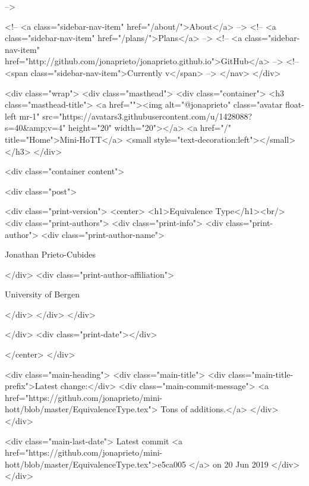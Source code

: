       
     -->

    <!-- <a class="sidebar-nav-item" href="/about/">About</a> -->
    <!-- <a class="sidebar-nav-item" href="/plans/">Plans</a> -->
    <!-- <a class="sidebar-nav-item" href="http://github.com/jonaprieto/jonaprieto.github.io">GitHub</a> -->
    <!-- <span class="sidebar-nav-item">Currently v</span> -->
  </nav>
</div>

    <div class="wrap">
      <div class="masthead">
        <div class="container">
          <h3 class="masthead-title">
            <a href=""><img alt="@jonaprieto" class="avatar float-left mr-1" src="https://avatars3.githubusercontent.com/u/1428088?s=40&amp;v=4" height="20" width="20"></a>
            <a href="/" title="Home">Mini-HoTT</a>
            <small style="text-decoration:left"></small>
          </h3>
        </div>
      
      <div class="container content">
        







<div class="post">

  <div class="print-version">
    <center>
      <h1>Equivalence Type</h1><br/>
        <div class="print-authors">
          <div class="print-info">
            <div class="print-author">
              <div class="print-author-name">
                
                  Jonathan Prieto-Cubides
                
              </div>
              <div class="print-author-affiliation">
                
                  University of Bergen
                
                </div>
            </div>
          </div>
          
          
        </div>
        <div class="print-date"></div>
        
        
    </center>
  </div>

  
  <div class="main-heading">
    <div class="main-title">
      <div class="main-title-prefix">Latest change:</div>
      <div class="main-commit-message">
            <a href="https://github.com/jonaprieto/mini-hott/blob/master/EquivalenceType.tex">
              Tons of additions.</a>
      </div>
    </div>

    <div class="main-last-date">
      Latest commit <a href="https://github.com/jonaprieto/mini-hott/blob/master/EquivalenceType.tex">e5ca005 </a> on  20 Jun 2019
    </div>
  </div>
  
